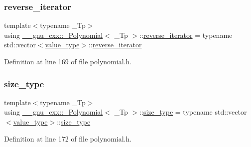 \subsubsection{\texorpdfstring{reverse\+\_\+iterator}{reverse\_iterator}}
{\footnotesize\ttfamily template$<$typename \+\_\+\+Tp$>$ \\
using \hyperlink{class____gnu__cxx_1_1__Polynomial}{\+\_\+\+\_\+gnu\+\_\+cxx\+::\+\_\+\+Polynomial}$<$ \+\_\+\+Tp $>$\+::\hyperlink{class____gnu__cxx_1_1__Polynomial_aed8f7d97c575d5c34c54170631953415}{reverse\+\_\+iterator} =  typename std\+::vector$<$\hyperlink{class____gnu__cxx_1_1__Polynomial_a725563351f50e76084a7a016c06f8a53}{value\+\_\+type}$>$\+::\hyperlink{class____gnu__cxx_1_1__Polynomial_aed8f7d97c575d5c34c54170631953415}{reverse\+\_\+iterator}}



Definition at line 169 of file polynomial.\+h.

\mbox{\label{class____gnu__cxx_1_1__Polynomial_a8b25fcfd4acaad0c5c08b649c22da28a}} 
\subsubsection{\texorpdfstring{size\+\_\+type}{size\_type}}
{\footnotesize\ttfamily template$<$typename \+\_\+\+Tp$>$ \\
using \hyperlink{class____gnu__cxx_1_1__Polynomial}{\+\_\+\+\_\+gnu\+\_\+cxx\+::\+\_\+\+Polynomial}$<$ \+\_\+\+Tp $>$\+::\hyperlink{class____gnu__cxx_1_1__Polynomial_a8b25fcfd4acaad0c5c08b649c22da28a}{size\+\_\+type} =  typename std\+::vector$<$\hyperlink{class____gnu__cxx_1_1__Polynomial_a725563351f50e76084a7a016c06f8a53}{value\+\_\+type}$>$\+::\hyperlink{class____gnu__cxx_1_1__Polynomial_a8b25fcfd4acaad0c5c08b649c22da28a}{size\+\_\+type}}



Definition at line 172 of file polynomial.\+h.

\mbox{\label{class____gnu__cxx_1_1__Polynomial_a725563351f50e76084a7a016c06f8a53}} 
